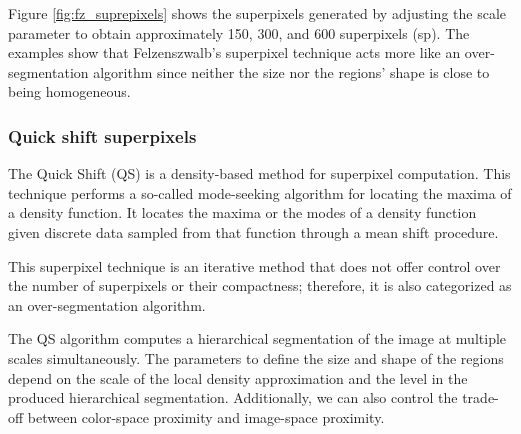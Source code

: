 Figure \ref{fig:fz_suprepixels} shows the superpixels generated by adjusting the scale parameter to obtain approximately 150, 300, and 600 superpixels (sp). The examples show that Felzenszwalb's superpixel technique acts more like an over-segmentation algorithm since neither the size nor the regions' shape is close to being homogeneous.
 
\subsubsection{Quick shift superpixels} 

The Quick Shift (QS) \citep{Vedaldi.Soatto:ECCV:2008} is a density-based method for superpixel computation. This technique performs a so-called mode-seeking algorithm \citep{YizongCheng:PAMI:1995} for locating the maxima of a density function. It locates the maxima or the modes of a density function given discrete data sampled from that function through a mean shift procedure.

This superpixel technique is an iterative method that does not offer control over the number of superpixels or their compactness; therefore, it is also categorized as an over-segmentation algorithm.

The QS algorithm computes a hierarchical segmentation of the image at multiple scales simultaneously. The parameters to define the size and shape of the regions depend on the scale of the local density approximation and the level in the produced hierarchical segmentation. Additionally, we can also control the trade-off between color-space proximity and image-space proximity.

